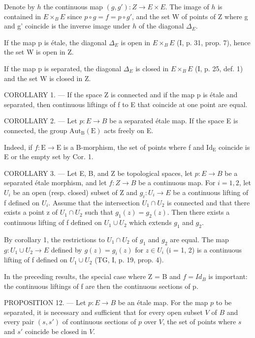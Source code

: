 Denote by \(h\) the continuous map \((g, g')\colon Z \to E \times E\). The image of \(h\) is contained in \(E \times_{B} E\) since \(p \circ g = f = p \circ g'\), and the set W of points of Z where g and g' coincide is the inverse image under \(h\) of the diagonal \(\Delta_{E}\).

If the map p is étale, the diagonal \(\Delta_{E}\) is open in \(E \times_{B} E\) (I, p. 31, prop. 7), hence the set W is open in Z.

If the map p is separated, the diagonal \(\Delta_{E}\) is closed in \(E \times_{B} E\) (I, p. 25, def. 1) and the set W is closed in Z.

COROLLARY 1. --- If the space Z is connected and if the map p is étale and separated, then continuous liftings of f to E that coincide at one point are equal.

COROLLARY 2. --- Let \(p\colon E \to B\) be a separated étale map. If the space E is connected, the group \(\mathrm{Aut}_{\mathrm{B}}(\mathrm{E})\) acts freely on E.

Indeed, if \(f: \mathrm{E} \to \mathrm{E}\) is a B-morphism, the set of points where f and \(\mathrm{Id}_{\mathrm{E}}\) coincide is E or the empty set by Cor. 1.

COROLLARY 3. --- Let E, B, and Z be topological spaces, let \(p\colon E \to B\) be a separated étale morphism, and let \(f\colon Z \to B\) be a continuous map. For \(i = 1,2\), let \(U_i\) be an open (resp. closed) subset of Z and \(g_i\colon U_i \to E\) be a continuous lifting of f defined on \(U_i\). Assume that the intersection \(U_1 \cap U_2\) is connected and that there exists a point z of \(U_1 \cap U_2\) such that \(g_1(z) = g_2(z)\). Then there exists a continuous lifting of f defined on \(U_1 \cup U_2\) which extends \(g_1\) and \(g_2\).

By corollary 1, the restrictions to \(U_{1} \cap U_{2}\) of \(g_{1}\) and \(g_{2}\) are equal. The map \(g: U_{1} \cup U_{2} \to E\) defined by \(g(z) = g_{i}(z)\) for \(z \in U_{i}\) (i = 1, 2) is a continuous lifting of f defined on \(U_{1} \cup U_{2}\) (TG, I, p. 19, prop. 4).

In the preceding results, the special case where Z = B and \(f = Id_{B}\) is important: the continuous liftings of f are then the continuous sections of p.

PROPOSITION 12. --- Let \(p \colon E \to B\) be an étale map. For the map \(p\) to be separated, it is necessary and sufficient that for every open subset \(V\) of \(B\) and every pair \((s, s')\) of continuous sections of \(p\) over \(V\), the set of points where \(s\) and \(s'\) coincide be closed in \(V\).

